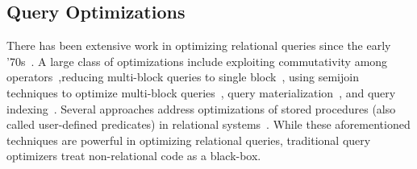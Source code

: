 \subsection{Query Optimizations}
There has been extensive work in optimizing relational queries since the early '70s~\cite{Chaudhuri:1998}. A large class of optimizations include exploiting commutativity among operators~\cite{Chaudhuri:1994,Yan:1995},reducing multi-block queries to single block~\cite{Kim:1982,Muralikrishna:1992}, using semijoin techniques to optimize multi-block queries~\cite{Mumick:1994,Seshadri:1996}, query materialization~\cite{Chaudhuri:1995,Phan:2008}, and query indexing~\cite{SELLIS1988175,Bertino:1989,Fang:2008}. Several approaches address optimizations of stored procedures (also called user-defined predicates) in relational systems~\cite{Hellerstein:1993,Chimenti:1989}. While these aforementioned techniques are powerful in optimizing relational queries, traditional query optimizers treat non-relational code as a black-box.


